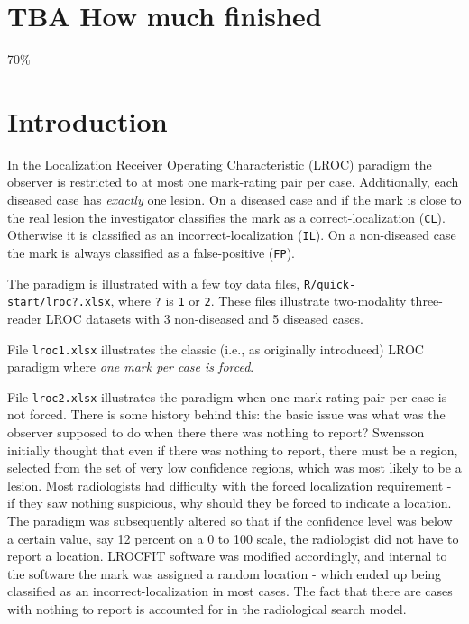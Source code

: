 \documentclass[
]{book}
\begin{document}
\hypertarget{quick-start-lroc-data-how-much-finished}{%
\section{TBA How much finished}\label{quick-start-lroc-data-how-much-finished}}

70\%

\hypertarget{quick-start-lroc-data-intro}{%
\section{Introduction}\label{quick-start-lroc-data-intro}}

In the Localization Receiver Operating Characteristic (LROC) paradigm \citep{starr1977comments, starr1975visual, swensson1996unified} the observer is restricted to at most one mark-rating pair per case. Additionally, each diseased case has \emph{exactly} one lesion. On a diseased case and if the mark is close to the real lesion the investigator classifies the mark as a correct-localization (\texttt{CL}). Otherwise it is classified as an incorrect-localization (\texttt{IL}). On a non-diseased case the mark is always classified as a false-positive (\texttt{FP}).

The paradigm is illustrated with a few toy data files, \texttt{R/quick-start/lroc?.xlsx}, where \texttt{?} is \texttt{1} or \texttt{2}. These files illustrate two-modality three-reader LROC datasets with 3 non-diseased and 5 diseased cases.

File \texttt{lroc1.xlsx} illustrates the classic (i.e., as originally introduced) LROC paradigm where \emph{one mark per case is forced}.

File \texttt{lroc2.xlsx} illustrates the paradigm when one mark-rating pair per case is not forced. There is some history behind this: the basic issue was what was the observer supposed to do when there there was nothing to report? Swensson initially thought that even if there was nothing to report, there must be a region, selected from the set of very low confidence regions, which was most likely to be a lesion. Most radiologists had difficulty with the forced localization requirement - if they saw nothing suspicious, why should they be forced to indicate a location. The paradigm was subsequently altered so that if the confidence level was below a certain value, say 12 percent on a 0 to 100 scale, the radiologist did not have to report a location. LROCFIT software was modified accordingly, and internal to the software the mark was assigned a random location - which ended up being classified as an incorrect-localization in most cases. The fact that there are cases with nothing to report is accounted for in the radiological search model.
\end{document}
